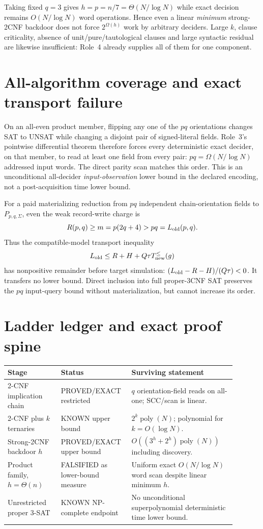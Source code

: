 \documentclass[11pt]{article}
\begin{document}
Taking fixed $q=3$ gives $h=p=n/7=\Theta(N/\log N)$ while exact decision remains $O(N/\log N)$ word operations.  Hence even a linear \emph{minimum} strong-2CNF backdoor does not force $2^{\Omega(h)}$ work by arbitrary deciders.  Large $k$, clause criticality, absence of unit/pure/tautological clauses and large syntactic residual are likewise insufficient: Role~4 already supplies all of them for one component.

\section{All-algorithm coverage and exact transport failure}
On an all-even product member, flipping any one of the $pq$ orientations changes SAT to UNSAT while changing a disjoint pair of signed-literal fields.  Role~3's pointwise differential theorem therefore forces every deterministic exact decider, on that member, to read at least one field from every pair: $pq=\Omega(N/\log N)$ addressed input words.  The direct parity scan matches this order.  This is an unconditional all-decider \emph{input-observation} lower bound in the declared encoding, not a post-acquisition time lower bound.

For a paid materializing reduction from $pq$ independent chain-orientation fields to $P_{p,q,\Sigma}$, even the weak record-write charge is
\[
R(p,q)\ge m=p(2q+4)>pq=L_{\rm old}(p,q).
\]
Thus the compatible-model transport inequality
\[
L_{\rm old}\le R+H+Q\tau T_{\rm new}^{\le}(g)
\]
has nonpositive remainder before target simulation:
$(L_{\rm old}-R-H)/(Q\tau)<0$.  It transfers no lower bound.  Direct inclusion into full proper-3CNF SAT preserves the $pq$ input-query bound without materialization, but cannot increase its order.

\section{Ladder ledger and exact proof spine}
\begin{center}\begin{tabular}{p{0.22\linewidth}p{0.24\linewidth}p{0.43\linewidth}}
Stage & Status & Surviving statement \\\hline
2-CNF implication chain & PROVED/EXACT restricted & $q$ orientation-field reads on all-one; SCC/scan is linear.\\
2-CNF plus $k$ ternaries & KNOWN upper bound & $2^k\operatorname{poly}(N)$; polynomial for $k=O(\log N)$.\\
Strong-2CNF backdoor $h$ & PROVED/EXACT upper bound & $O((3^h+2^h)\operatorname{poly}(N))$ including discovery.\\
Product family, $h=\Theta(n)$ & FALSIFIED as lower-bound measure & Uniform exact $O(N/\log N)$ word scan despite linear minimum $h$.\\
Unrestricted proper 3-SAT & KNOWN NP-complete endpoint & No unconditional superpolynomial deterministic time lower bound.\\
\end{tabular}\end{center}
\end{document}
